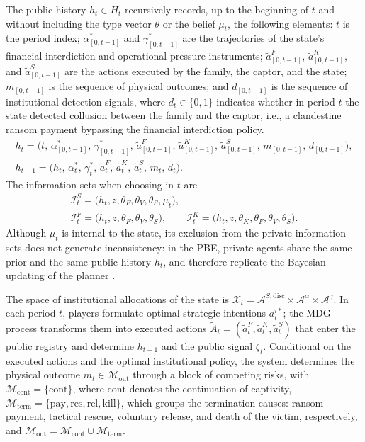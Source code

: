 \documentclass[review,authoryear,12pt]{elsarticle}
\theoremstyle{plain}
\theoremstyle{definition}
\newcommand{\1}{\mathbf{1}}
\begin{document}
The public history $h_t\in H_t$ recursively records, up to the beginning of $t$ and without including the type vector $\theta$ or the belief $\mu_t$, the following elements: $t$ is the period index; $\alpha^\ast_{[0,t-1]}$ and $\gamma^\ast_{[0,t-1]}$ are the trajectories of the state's financial interdiction and operational pressure instruments; $\tilde{a}^F_{[0,t-1]}$, $\tilde{a}^K_{[0,t-1]}$, and $\tilde{a}^S_{[0,t-1]}$ are the actions executed by the family, the captor, and the state; $m_{[0,t-1]}$ is the sequence of physical outcomes; and $d_{[0,t-1]}$ is the sequence of institutional detection signals, where $d_t\in\{0,1\}$ indicates whether in period $t$ the state detected collusion between the family and the captor, i.e., a clandestine ransom payment bypassing the financial interdiction policy.
\begin{gather}
h_t = \bigl(t,\,\alpha^\ast_{[0,t-1]},\,\gamma^\ast_{[0,t-1]},\,\tilde{a}^F_{[0,t-1]},\,\tilde{a}^K_{[0,t-1]},\,\tilde{a}^S_{[0,t-1]},\,m_{[0,t-1]},\,d_{[0,t-1]}\bigr),\label{eq:historia-publica}\\
h_{t+1} = \bigl(h_t,\,\alpha_t^\ast,\,\gamma_t^\ast,\,\tilde{a}_t^F,\,\tilde{a}_t^K,\,\tilde{a}_t^S,\,m_t,\,d_t\bigr).\label{eq:actualizacion-historia}
\end{gather}
The information sets when choosing in $t$ are
\begin{gather*}
\mathcal{I}_t^S=\bigl(h_t,z,\theta_F,\theta_V,\theta_S,\mu_t\bigr),\\
\mathcal{I}_t^F=\bigl(h_t,z,\theta_F,\theta_V,\theta_S\bigr),\qquad
\mathcal{I}_t^K=\bigl(h_t,z,\theta_K,\theta_F,\theta_V,\theta_S\bigr).
\end{gather*}
Although $\mu_t$ is internal to the state, its exclusion from the private information sets does not generate inconsistency: in the PBE, private agents share the same prior and the same public history $h_t$, and therefore replicate the Bayesian updating of the planner \citet{FudenbergTirole1991}.

The space of institutional allocations of the state is $\mathcal{X}_t=\mathcal{A}^{S,\mathrm{disc}}\times\mathcal{A}^{\alpha}\times\mathcal{A}^{\gamma}$. In each period $t$, players formulate optimal strategic intentions $a_t^{i\ast}$; the MDG process transforms them into executed actions $\tilde{A}_t=(\tilde{a}_t^F,\tilde{a}_t^K,\tilde{a}_t^S)$ that enter the public registry and determine $h_{t+1}$ and the public signal $\zeta_t$. Conditional on the executed actions and the optimal institutional policy, the system determines the physical outcome $m_t\in\mathcal{M}_{\mathrm{out}}$ through a block of competing risks, with $\mathcal{M}_{\mathrm{cont}}=\{\mathrm{cont}\}$, where $\mathrm{cont}$ denotes the continuation of captivity, $\mathcal{M}_{\mathrm{term}}=\{\mathrm{pay},\mathrm{res},\mathrm{rel},\mathrm{kill}\}$, which groups the termination causes: ransom payment, tactical rescue, voluntary release, and death of the victim, respectively, and $\mathcal{M}_{\mathrm{out}}=\mathcal{M}_{\mathrm{cont}}\cup\mathcal{M}_{\mathrm{term}}$.
\end{document}
